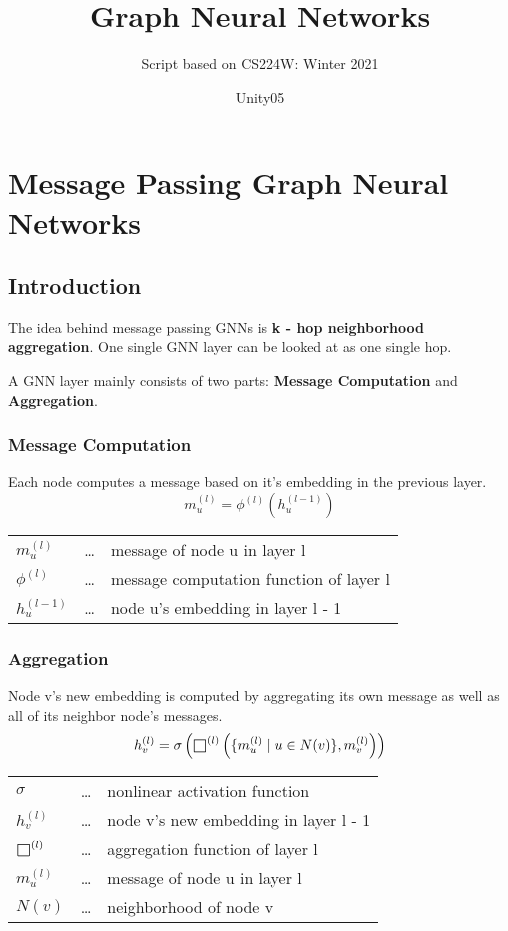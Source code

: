 \documentclass[parskip=full]{scrartcl}
\title{Graph Neural Networks}
\subtitle{Script based on CS224W: Winter 2021}
\author{Unity05}
\def\msquare{\mathord{\scalerel*{\Box}{gX}}}
\begin{document}
\begin{titlepage}
\maketitle
\end{titlepage}

\newpage
\tableofcontents
\newpage

\section{Message Passing Graph Neural Networks}

\subsection{Introduction}
The idea behind message passing GNNs is \textbf{k - hop neighborhood aggregation}.
One single GNN layer can be looked at as one single hop.

A GNN layer mainly consists of two parts: \textbf{Message Computation} and \textbf{Aggregation}.

\subsubsection{Message Computation}
Each node computes a message based on it's embedding in the previous layer.
\[m_u^{(l)} = \phi^{(l)}\left(h_u^{(l-1)}\right)\]
\begin{center}
\begin{tabular}{l c l}
	$m_u^{(l)}$ & \dots & message of node u in layer l \\
	$\phi^{(l)}$ & \dots & message computation function of layer l \\
	$h_u^{(l - 1)}$ & \dots & node u's embedding in layer l - 1
\end{tabular}
\end{center}

\subsubsection{Aggregation}
Node v's new embedding is computed by aggregating its own message as well as all of its neighbor node's messages.
\[h_v^{(l)} = \sigma\left(\msquare^{(l)}\left(\{m_u^{(l)} \mid u \in N(v)\}, m_v^{(l)}\right)\right)\]
\begin{center}
\begin{tabular}{l c l}
	$\sigma$ & \dots & nonlinear activation function \\
	$h_v^{(l)}$ & \dots & node v's new embedding in layer l - 1 \\
	$\msquare^{(l)}$ & \dots & aggregation function of layer l \\
	$m_u^{(l)}$ & \dots & message of node u in layer l \\
	$N(v)$ & \dots & neighborhood of node v
\end{tabular}
\end{center}
\end{document}
